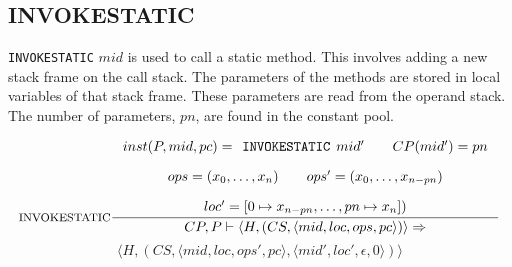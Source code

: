 \subsection{INVOKESTATIC}
\texttt{INVOKESTATIC} $mid$ is used to call a static method.
This involves adding a new stack frame on the call stack.
The parameters of the methods are stored in local variables of that stack frame.
These parameters are read from the operand stack.
The number of parameters, $pn$, are found in the constant pool. 

$$\inference[INVOKESTATIC]{
inst(P,mid,pc) = \texttt{INVOKESTATIC }mid' \semsp 
CP(mid') = pn \semnl \\
ops = (x_0, \ldots, x_n) \semsp
ops' = (x_0, \ldots, x_{n-pn}) \semnl\\
loc' = [0 \mapsto x_{n-pn}, \ldots, pn \mapsto x_n])}
{CP, P \vdash \langle H, (CS, \langle mid, loc, ops, pc \rangle)\rangle \Rightarrow }$$
$$\langle H, (CS, \langle mid, loc, ops', pc \rangle, \langle mid', loc', \epsilon, 0 \rangle)\rangle$$
